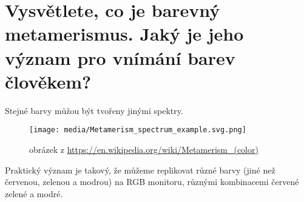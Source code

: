 \section{Vysvětlete, co je barevný metamerismus. Jaký je jeho význam pro vnímání barev člověkem?}
Stejné barvy můžou být tvořeny jinými spektry.
\begin{figure}[H]
  \center
  \texttt{[image: media/Metamerism\_spectrum\_example.svg.png]}
  \caption{obrázek z \url{https://en.wikipedia.org/wiki/Metamerism_(color)}\footnotemark}
\end{figure}
Praktický význam je takový, že můžeme replikovat různé barvy (jiné než červenou, zelenou a modrou) na RGB monitoru, různými kombinacemi červené zelené a modré.
